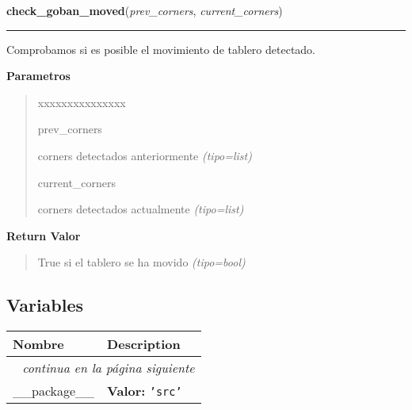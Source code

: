 \hspace{.8\funcindent}\begin{boxedminipage}{\funcwidth}

    \raggedright \textbf{check\_goban\_moved}(\textit{prev\_corners}, \textit{current\_corners})

    \vspace{-1.5ex}

    \rule{\textwidth}{0.5\fboxrule}
\setlength{\parskip}{2ex}
Comprobamos si es posible el movimiento de tablero detectado.

\setlength{\parskip}{1ex}
      \textbf{Parametros}
      \vspace{-1ex}

      \begin{quote}
        \begin{Ventry}{xxxxxxxxxxxxxxx}

          \item[prev\_corners]


corners detectados anteriormente
            {\it (tipo=list)}

          \item[current\_corners]


corners detectados actualmente
            {\it (tipo=list)}

        \end{Ventry}

      \end{quote}

      \textbf{Return Valor}
    \vspace{-1ex}

      \begin{quote}

True si el tablero se ha movido
      {\it (tipo=bool)}

      \end{quote}

    \end{boxedminipage}



  \subsection{Variables}

    \vspace{-1cm}
\hspace{\varindent}\begin{longtable}{|p{\varnamewidth}|p{\vardescrwidth}|l}
\cline{1-2}
\cline{1-2} \centering \textbf{Nombre} & \centering \textbf{Description}& \\
\cline{1-2}
\endhead\cline{1-2}\multicolumn{3}{r}{\small\textit{continua en la página siguiente}}\\\endfoot\cline{1-2}
\endlastfoot\raggedright \_\-\_\-p\-a\-c\-k\-a\-g\-e\-\_\-\_\- & \raggedright \textbf{Valor:} 
{\tt \texttt{'}\texttt{src}\texttt{'}}&\\
\cline{1-2}
\end{longtable}

